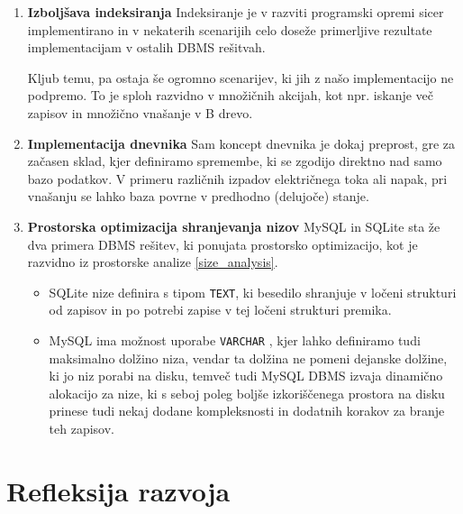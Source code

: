 \documentclass[a4paper,12pt,openright]{book}
\begin{document}
    \begin{enumerate}
        \item \textbf{Izboljšava indeksiranja}
        \newline
        \noindent
        Indeksiranje je v razviti programski opremi sicer implementirano in v nekaterih scenarijih celo doseže primerljive rezultate implementacijam v ostalih DBMS rešitvah.

        Kljub temu, pa ostaja še ogromno scenarijev, ki jih z našo implementacijo ne podpremo. To je sploh razvidno v množičnih akcijah, kot npr. iskanje več zapisov in množično vnašanje v B drevo.

        \item \textbf{Implementacija dnevnika}
        \newline
        \noindent
        Sam koncept dnevnika je dokaj preprost, gre za začasen sklad, kjer definiramo spremembe, ki se zgodijo direktno nad samo bazo podatkov. V primeru različnih izpadov električnega toka ali napak, pri vnašanju se lahko baza povrne v predhodno (delujoče) stanje.

        \item \textbf{Prostorska optimizacija shranjevanja nizov}
        \newline
        \noindent
        MySQL in SQLite sta že dva primera DBMS rešitev, ki ponujata prostorsko optimizacijo, kot je razvidno iz prostorske analize \ref{size_analysis}.
        \begin{itemize}
            \item SQLite nize definira s tipom {\tt TEXT}, ki besedilo shranjuje v ločeni strukturi od zapisov in po potrebi zapise v tej ločeni strukturi premika.
            \item MySQL ima možnost uporabe {\tt VARCHAR} \cite{MYSQL_VARCHAR}, kjer lahko definiramo tudi maksimalno dolžino niza, vendar ta dolžina ne pomeni dejanske dolžine, ki jo niz porabi na disku, temveč tudi MySQL DBMS izvaja dinamično alokacijo za nize, ki s seboj poleg boljše izkoriščenega prostora na disku prinese tudi nekaj dodane kompleksnosti in dodatnih korakov za branje teh zapisov.
        \end{itemize}
    \end{enumerate}
    
    \section{Refleksija razvoja}
    \label{refleksija}
\end{document}
